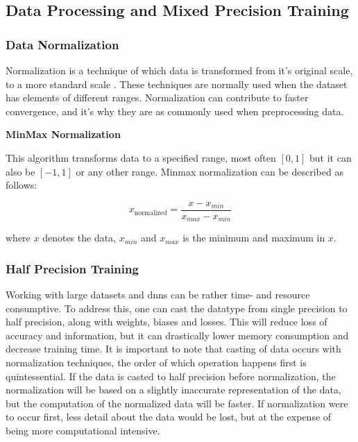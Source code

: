 \subsection{Data Processing and Mixed Precision Training}
\label{back:data}

\subsubsection{Data Normalization}

Normalization is a technique of which data is transformed from it's original scale, to a more standard scale \cite{ali2014data}. These techniques are normally used when the dataset has elements of different ranges. Normalization can contribute to faster convergence, and it's why they are as commonly used when preprocessing data. 

\textbf{MinMax Normalization} 

This algorithm transforms data to a specified range, most often $[0, 1]$ but it can also be $[-1, 1]$ or any other range.
Minmax normalization can be described as follows:

\begin{equation}
   x_{\text{normalized}} = \dfrac{x - x_{min}}{x_{max}-x_{min}}
\end{equation}
\vspace{0.2cm}

where $x$ denotes the data, $x_{min}$ and $x_{max}$ is the minimum and maximum in $x$. \\

\subsubsection{Half Precision Training}

Working with large datasets and \acrshort{dnn}s can be rather time- and resource consumptive. To address this, one can cast the datatype from single precision to half precision, along with weights, biases and losses. This will reduce loss of accuracy and information, but it can drastically lower memory consumption and decrease training time. It is important to note that casting of data occurs with normalization techniques, the order of which operation happens first is quintessential. If the data is casted to half precision before normalization, the normalization will be based on a slightly inaccurate representation of the data, but the computation of the normalized data will be faster. If normalization were to occur first, less detail about the data would be lost, but at the expense of being more computational intensive. \\

